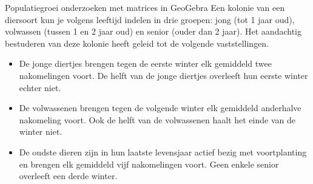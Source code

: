 \begin{lesactiviteit}{Populatiegroei onderzoeken met matrices in GeoGebra}
    Een kolonie van een diersoort kun je volgens leeftijd indelen in drie groepen: jong (tot 1 jaar oud), volwassen (tussen 1 en 2 jaar oud) en senior (ouder dan 2 jaar). Het aandachtig bestuderen van deze kolonie heeft geleid tot de volgende vaststellingen.
    \begin{itemize}
        \item De jonge diertjes brengen tegen de eerste winter elk gemiddeld twee nakomelingen voort. De helft van de jonge diertjes overleeft hun eerste winter echter niet.
        \item De volwassenen brengen tegen de volgende winter elk gemiddeld anderhalve nakomeling voort. Ook de helft van de volwassenen haalt het einde van de winter niet.
        \item De oudste dieren zijn in hun laatste levensjaar actief bezig met voortplanting en brengen elk gemiddeld vijf nakomelingen voort. Geen enkele senior overleeft een derde winter. 
    \end{itemize}

    \begin{vraagenantwoord}


\end{vraagenantwoord}
\end{lesactiviteit}
